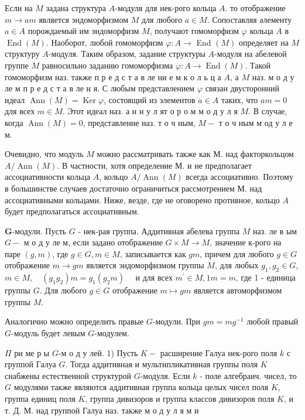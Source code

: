 \documentclass[10pt]{article}
\begin{document}
Если на $M$ задана структура $A$-модуля для нек-рого кольца $A$. то отображение $m \rightarrow a m$ является эндоморфизмом $M$ для любого $a \in M$. Сопоставляя әлементу $a \in A$ порождаемый им эндоморфизм $M$, получают гомоморфизм $\varphi$ кольца $A$ в $\operatorname{End}(M)$. Наоборот, любой гомоморфизм $\varphi: A \rightarrow$ End $(M)$ определяет на $M$ структуру $A$-модуля. Таким образом, задание структуры $A$-модуля на абелевой группе $M$ равносильно заданию гомоморфизма $\varphi: A \rightarrow \operatorname{End}(M)$. Такой гомоморфизм наз. также п р е д с т а в ле ни е м к о л ь ц а $A$, а $M$ наз. м о д у ле м п р е д с т а в ле н я. С любым представлением $\varphi$ связан двусторонний идеал $\operatorname{Ann}(M)=\operatorname{Ker} \varphi$, состоящий из элементов $a \in A$ таких, что $a m=0$ для всех $m \in M$. Этот идеал наз. а н н у л ят о р о м м о д у л я $M$. В случае, когда $\operatorname{Ann}(M)=0$, представление наз. т о ч ным, $M-$ т о ч ным м од у л е м.



Очевидно, что модуль $M$ можно рассматривать также как М. над факторкольцом $A / \operatorname{Ann}(M)$. В частности, хотя определение М. и не предполагает ассоциативности кольца $A$, кольцо $A / \operatorname{Ann}(M)$ всегда ассоциативно. Поэтому в большинстве случаев достаточно ограничиться рассмотрением М. над ассоциативными кольцами. Ниже, везде, где не оговорено противное, кольцо $A$ будет предполагаться ассоциативным.



$\boldsymbol{G}$-модули. Пусть $G$ - нек-рая группа. Аддитивная абелева группа $M$ наз. ле в ым $G-$ м о д у ле м, если задано отображение $G \times M \rightarrow M$, значение к-рого на паре $(g, m)$, где $g \in G, m \in M$, записывается как $g m$, причем для любого $g \in G$ отображение $m \rightarrow g m$ является эндоморфизмом группы $M$, для любых $g_{1}, g_{2} \in G$, $m \in M, \quad\left(g_{1} g_{2}\right) m=g_{1}\left(g_{2} m\right) \quad$ и для всех $m^{\prime} \in M, 1 m=m$, где 1 - единица группы $G$. Для любого $g \in G$ отображение $m \longmapsto g m$ является автоморфизмом группы $M$.



Аналогично можно определить правые $G$-модули. При $g m=m g^{-1}$ любой правый $G$-модуль будет левым $G$-модулем.



$\Pi$ ри ме р ы $G$-м о д у лей. 1) Пусть $K-$ расширение Галуа нек-рого поля $k$ с группой Галуа $G$. Тогда аддитивная и мультипликативная группы поля $K$ снабжены естественной структурой $G$-модуля. Если $k$ - поле алгебраич. чисел, то $G$ модулями также являются аддитивная группа кольца целых чисел поля $K$, группа единиц поля $K$, группа дивизоров и группа классов дивизоров поля $K$, и т. Д. М. над группой Галуа наз. также м о д у л я м и
\end{document}
